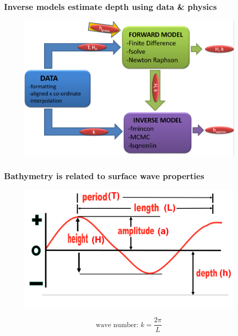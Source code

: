 \documentclass[7pt]{beamer}
\begin{document}
    \begin{frame}
      \frametitle{Inverse models estimate depth using data \& physics}

      \begin{figure}[H]
        \centering
        \includegraphics[width=1.0\linewidth]{img/Flow_C.png}
      \end{figure}
    \end{frame}

    \begin{frame}
      \frametitle{Bathymetry is related to surface wave properties}
      \begin{figure}[flowchart]
        \includegraphics[width=1.0\linewidth]{img/Wave.jpg}
      \end{figure}
      \centering
      \begin{equation*}
        \textrm{wave number: } k = \frac{2\pi}{L}
      \end{equation*}
    \end{frame}
\end{document}
